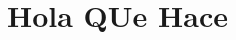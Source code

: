 \documentclass{article}
\begin{document}
\section[Hola que hace]{Hola QUe Hace}
\begin{equation}
  \label{eq1}
\end{equation}






\tableofcontents{}
\end{document}
